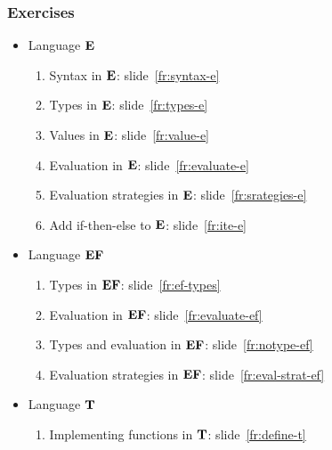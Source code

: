 \documentclass[compress]{beamer}
\begin{document}
\begin{frame}
  \frametitle{Exercises}
  \begin{itemize}
  \item Language $\textbf{E}$    
    \begin{enumerate}
    \item Syntax in $\textbf{E}$: slide~\ref{fr:syntax-e}
    \item Types in $\textbf{E}$: slide~\ref{fr:types-e}
    \item Values in $\textbf{E}$: slide~\ref{fr:value-e}
    \item Evaluation in $\textbf{E}$: slide~\ref{fr:evaluate-e}
    \item Evaluation strategies in $\textbf{E}$: slide~\ref{fr:srategies-e}
    \item Add if-then-else to $\textbf{E}$: slide~\ref{fr:ite-e}
      
    \end{enumerate}
  \item  Language $\textbf{EF}$
    \begin{enumerate}  
    \item Types in $\textbf{EF}$: slide~\ref{fr:ef-types}
    \item   Evaluation in $\textbf{EF}$: slide~\ref{fr:evaluate-ef}
    \item Types and evaluation in $\textbf{EF}$:
      slide~\ref{fr:notype-ef}
    \item  Evaluation strategies in $\textbf{EF}$: slide~\ref{fr:eval-strat-ef}
    \end{enumerate}
  \item Language $\textbf{T}$
    \begin{enumerate}
    \item Implementing functions in $\textbf{T}$: slide~\ref{fr:define-t}
    \end{enumerate}

  \end{itemize}
\end{frame}







\end{document}
